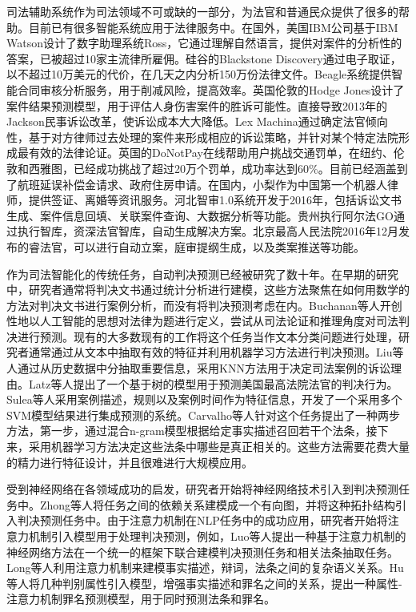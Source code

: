 司法辅助系统作为司法领域不可或缺的一部分，为法官和普通民众提供了很多的帮助。目前已有很多智能系统应用于法律服务中。在国外，美国IBM公司基于IBM Watson设计了数字助理系统Ross，它通过理解自然语言，提供对案件的分析性的答案，已被超过10家主流律所雇佣。硅谷的Blackstone Discovery通过电子取证，以不超过10万美元的代价，在几天之内分析150万份法律文件。Beagle系统提供智能合同审核分析服务，用于削减风险，提高效率。英国伦敦的Hodge Jones设计了案件结果预测模型，用于评估人身伤害案件的胜诉可能性。直接导致2013年的Jackson民事诉讼改革，使诉讼成本大大降低。Lex Machina通过确定法官倾向性，基于对方律师过去处理的案件来形成相应的诉讼策略，并针对某个特定法院形成最有效的法律论证。英国的DoNotPay在线帮助用户挑战交通罚单，在纽约、伦敦和西雅图，已经成功挑战了超过20万个罚单，成功率达到60$\%$。目前已经涵盖到了航班延误补偿金请求、政府住房申请。在国内，小梨作为中国第一个机器人律师，提供签证、离婚等资讯服务。河北智审1.0系统开发于2016年，包括诉讼文书生成、案件信息回填、关联案件查询、大数据分析等功能。贵州执行阿尔法GO通过执行智库，资深法官智库，自动生成解决方案。北京最高人民法院2016年12月发布的睿法官，可以进行自动立案，庭审提纲生成，以及类案推送等功能。

作为司法智能化的传统任务，自动判决预测已经被研究了数十年。在早期的研究中，研究者通常将判决文书通过统计分析进行建模\cite{LiuC03, kort1957predicting, nagel1963applying, ulmer1963quantitative, keown1980mathematical}，这些方法聚焦在如何用数学的方法对判决文书进行案例分析，而没有将判决预测考虑在内。Buchanan等人开创性地以人工智能的思想对法律为题进行定义，尝试从司法论证和推理角度对司法判决进行预测\cite{buchanan1970some}。现有的大多数现有的工作将这个任务当作文本分类问题进行处理，研究者通常通过从文本中抽取有效的特征并利用机器学习方法进行判决预测\cite{kim2014legal, AletrasTPL16, liu2015predicting}。Liu等人通过从历史数据中分抽取重要信息，采用KNN方法用于决定司法案例的诉讼理由\cite{LiuCH04}。Latz等人提出了一个基于树的模型用于预测美国最高法院法官的判决行为\cite{KatzBB14}。Sulea等人采用案例描述，规则以及案例时间作为特征信息，开发了一个采用多个SVM模型结果进行集成预测的系统\cite{Sulea2017Exploring}。Carvalho等人针对这个任务提出了一种两步方法，第一步，通过混合n-gram模型根据给定事实描述召回若干个法条，接下来，采用机器学习方法决定这些法条中哪些是真正相关的\cite{carvalho2015lexical}。这些方法需要花费大量的精力进行特征设计，并且很难进行大规模应用。

受到神经网络在各领域成功的启发\cite{Kim14, BordesGWB12, LuongSLVZ15}，研究者开始将神经网络技术引入到判决预测任务中。Zhong等人将任务之间的依赖关系建模成一个有向图，并将这种拓扑结构引入判决预测任务中\cite{ZhongGTX0S18}。由于注意力机制在NLP任务中的成功应用，研究者开始将注意力机制引入模型用于处理判决预测，例如，Luo等人提出一种基于注意力机制的神经网络方法在一个统一的框架下联合建模判决预测任务和相关法条抽取任务\cite{luo2017learning}。Long等人利用注意力机制来建模事实描述，辩词，法条之间的复杂语义关系\cite{abs-1809-06537}。Hu等人将几种判别属性引入模型，增强事实描述和罪名之间的关系，提出一种属性-注意力机制罪名预测模型，用于同时预测法条和罪名\cite{C18-1041}。

